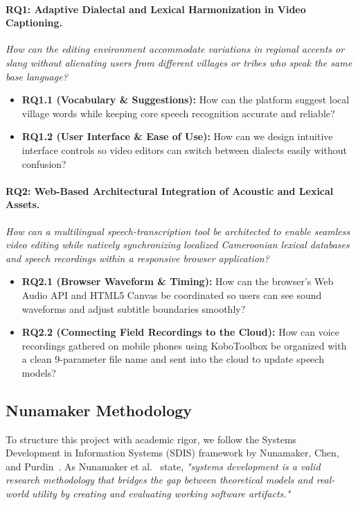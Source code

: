 \documentclass[a4paper,11pt]{article}
\begin{document}
\paragraph{\textbf{RQ1: Adaptive Dialectal and Lexical Harmonization in Video Captioning.}}
\textit{How can the editing environment accommodate variations in regional accents or slang without alienating users from different villages or tribes who speak the same base language?}
\begin{itemize}
    \item \textbf{RQ1.1 (Vocabulary \& Suggestions):} How can the platform suggest local village words while keeping core speech recognition accurate and reliable?
    \item \textbf{RQ1.2 (User Interface \& Ease of Use):} How can we design intuitive interface controls so video editors can switch between dialects easily without confusion?
\end{itemize}

\paragraph{\textbf{RQ2: Web-Based Architectural Integration of Acoustic and Lexical Assets.}}
\textit{How can a multilingual speech-transcription tool be architected to enable seamless video editing while natively synchronizing localized Cameroonian lexical databases and speech recordings within a responsive browser application?}
\begin{itemize}
    \item \textbf{RQ2.1 (Browser Waveform \& Timing):} How can the browser's Web Audio API and HTML5 Canvas be coordinated so users can see sound waveforms and adjust subtitle boundaries smoothly?
    \item \textbf{RQ2.2 (Connecting Field Recordings to the Cloud):} How can voice recordings gathered on mobile phones using KoboToolbox be organized with a clean 9-parameter file name and sent into the cloud to update speech models?
\end{itemize}

\subsection{Nunamaker Methodology}
\label{sec:chap1_methodology}

To structure this project with academic rigor, we follow the Systems Development in Information Systems (SDIS) framework by Nunamaker, Chen, and Purdin~\cite{nunamaker1990systems}. As Nunamaker et al.~\cite{nunamaker1990systems} state, \textit{"systems development is a valid research methodology that bridges the gap between theoretical models and real-world utility by creating and evaluating working software artifacts."}
\end{document}
